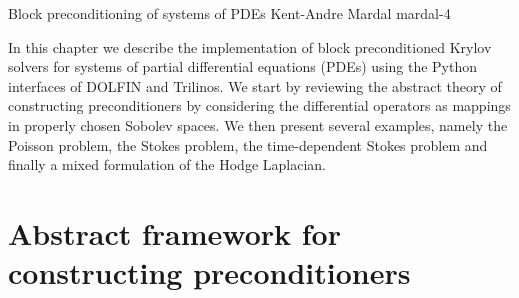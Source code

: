 

              {Block preconditioning of systems of PDEs}
              {Kent-Andre Mardal}
              {mardal-4}

In this chapter we describe the implementation of block preconditioned
Krylov solvers for systems of partial differential equations (PDEs)
using the Python interfaces of DOLFIN and Trilinos.
We start by reviewing the abstract theory of constructing
preconditioners by considering the differential
operators as mappings in properly chosen Sobolev spaces. We then
present several examples, namely the Poisson problem, the Stokes
problem, the time-dependent Stokes problem and finally a mixed
formulation of the Hodge Laplacian.

\section{Abstract framework for constructing preconditioners}

